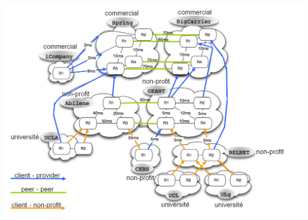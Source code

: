 \documentclass[11pt,a4paper]{article}
\begin{document}
\includegraphics[scale=0.3]{topo.png}
\end{document}
